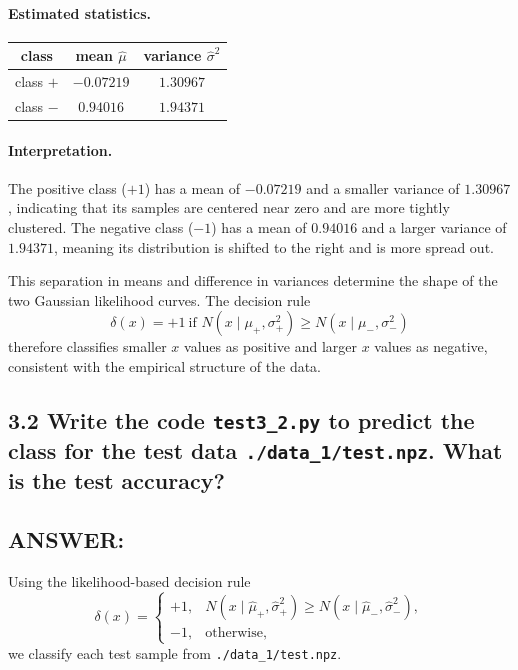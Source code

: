 \documentclass[12pt]{article}
\begin{document}
\paragraph{Estimated statistics.}

\begin{center}
\begin{tabular}{c|c|c}
\hline
class & mean $\hat{\mu}$ & variance $\hat{\sigma}^2$ \\
\hline
class $+$ & $-0.07219$ & $1.30967$ \\
class $-$ & $0.94016$  & $1.94371$ \\
\hline
\end{tabular}
\end{center}

\paragraph{Interpretation.}
The positive class ($+1$) has a mean of $-0.07219$ and a smaller variance of $1.30967$,
indicating that its samples are centered near zero and are more tightly clustered.
The negative class ($-1$) has a mean of $0.94016$ and a larger variance of $1.94371$,
meaning its distribution is shifted to the right and is more spread out.

This separation in means and difference in variances determine the shape of the two
Gaussian likelihood curves. The decision rule
\[
\delta(x)=+1 \ \text{if } N(x \mid \mu_{+}, \sigma_{+}^{2})
           \ge N(x \mid \mu_{-}, \sigma_{-}^{2})
\]
therefore classifies smaller $x$ values as positive and larger $x$ values as negative,
consistent with the empirical structure of the data.


\subsection*{3.2
Write the code \texttt{test3\_2.py} to predict the class for the test data \texttt{./data\_1/test.npz}. What is the test accuracy?}

\subsection*{ANSWER:}
Using the likelihood-based decision rule
\[
\delta(x) = 
\begin{cases}
+1, & N(x \mid \hat{\mu}_{+},\hat{\sigma}^{2}_{+}) 
      \ge 
      N(x \mid \hat{\mu}_{-},\hat{\sigma}^{2}_{-}),\\[4pt]
-1, & \text{otherwise},
\end{cases}
\]
we classify each test sample from \texttt{./data\_1/test.npz}.
\end{document}
